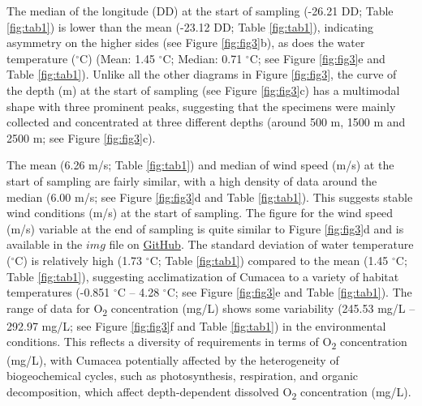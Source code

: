 {The median of the longitude (DD) at the start of sampling (-26.21 DD; Table \ref{fig:tab1}) is lower than the mean (-23.12 DD; Table \ref{fig:tab1}), indicating asymmetry on the higher sides (see Figure \ref{fig:fig3}b), as does the water temperature ($^\circ$C) (Mean: 1.45 $^\circ$C; Median: 0.71 $^\circ$C; see Figure \ref{fig:fig3}e and Table \ref{fig:tab1}). Unlike all the other diagrams in Figure \ref{fig:fig3}, the curve of the depth (m) at the start of sampling (see Figure \ref{fig:fig3}c) has a multimodal shape with three prominent peaks, suggesting that the specimens were mainly collected and concentrated at three different depths (around 500 m, 1500 m and 2500 m; see Figure \ref{fig:fig3}c).

The mean (6.26 m/s; Table \ref{fig:tab1}) and median of wind speed (m/s) at the start of sampling are fairly similar, with a high density of data around the median (6.00 m/s; see Figure \ref{fig:fig3}d and Table \ref{fig:tab1}). This suggests stable wind conditions (m/s) at the start of sampling. The figure for the wind speed (m/s) variable at the end of sampling is quite similar to Figure \ref{fig:fig3}d and is available in the $img$ file on \href{https://github.com/tahiri-lab/Cumacea_aPhyloGeo}{GitHub}. The standard deviation of water temperature ($^\circ$C) is relatively high (1.73 $^\circ$C; Table \ref{fig:tab1}) compared to the mean (1.45 $^\circ$C; Table \ref{fig:tab1}), suggesting acclimatization of Cumacea to a variety of habitat temperatures (-0.851 $^\circ$C – 4.28 $^\circ$C; see Figure \ref{fig:fig3}e and Table \ref{fig:tab1}). The range of data for O\textsubscript{2} concentration (mg/L) shows some variability (245.53 mg/L – 292.97 mg/L; see Figure \ref{fig:fig3}f and Table \ref{fig:tab1}) in the environmental conditions. This reflects a diversity of requirements in terms of O\textsubscript{2} concentration (mg/L), with Cumacea potentially affected by the heterogeneity of biogeochemical cycles, such as photosynthesis, respiration, and organic decomposition, which affect depth-dependent dissolved O\textsubscript{2} concentration (mg/L).

}
